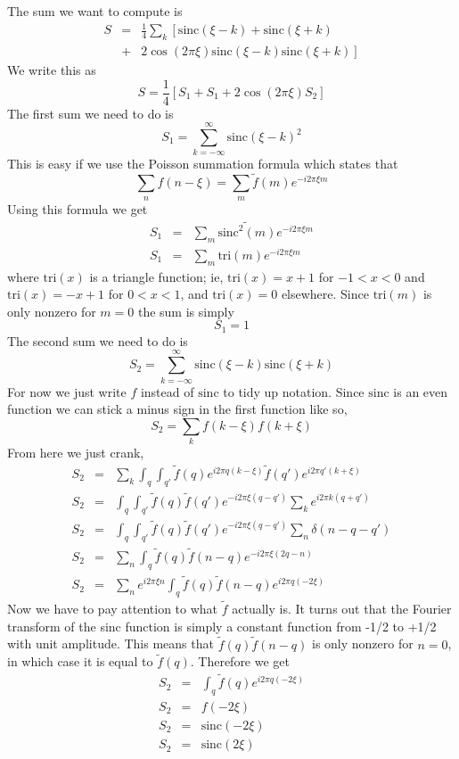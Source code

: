 The sum we want to compute is\begin{eqnarray*}
S & = & \frac{1}{4}\sum_{k}\left[\textrm{sinc}(\xi-k)+\textrm{sinc}(\xi+k)\right.\\
 & + & \left.2\cos(2\pi\xi)\textrm{sinc}(\xi-k)\textrm{sinc}(\xi+k)\right]\end{eqnarray*}
We write this as\[
S=\frac{1}{4}\left[S_{1}+S_{1}+2\cos(2\pi\xi)S_{2}\right]\]
The first sum we need to do is\[
S_{1}=\sum_{k=-\infty}^{\infty}\textrm{sinc}(\xi-k)^{2}\]
This is easy if we use the Poisson summation formula which states
that\[
\sum_{n}f(n-\xi)=\sum_{m}\tilde{f}(m)e^{-i2\pi\xi m}\]
Using this formula we get\begin{eqnarray*}
S_{1} & = & \sum_{m}\widetilde{\textrm{sinc}^{2}\left(m\right)}e^{-i2\pi\xi m}\\
S_{1} & = & \sum_{m}\textrm{tri}(m)e^{-i2\pi\xi m}\end{eqnarray*}
where $\textrm{tri}(x)$ is a triangle function; ie, $\textrm{tri}(x)=x+1$
for $-1<x<0$ and $\textrm{tri}(x)=-x+1$ for $0<x<1$, and $\textrm{tri}(x)=0$
elsewhere. Since $\textrm{tri}(m)$ is only nonzero for $m=0$ the
sum is simply\[
S_{1}=1\]
The second sum we need to do is\[
S_{2}=\sum_{k=-\infty}^{\infty}\textrm{sinc}(\xi-k)\textrm{sinc}(\xi+k)\]
For now we just write $f$ instead of $\textrm{sinc}$ to tidy up
notation. Since $\textrm{sinc}$ is an even function we can stick
a minus sign in the first function like so,\[
S_{2}=\sum_{k}f(k-\xi)f(k+\xi)\]
From here we just crank,\begin{eqnarray*}
S_{2} & = & \sum_{k}\int_{q}\int_{q'}\tilde{f}(q)e^{i2\pi q(k-\xi)}\tilde{f}(q')e^{i2\pi q'(k+\xi)}\\
S_{2} & = & \int_{q}\int_{q'}\tilde{f}(q)\tilde{f}(q')e^{-i2\pi\xi(q-q')}\sum_{k}e^{i2\pi k(q+q')}\\
S_{2} & = & \int_{q}\int_{q'}\tilde{f}(q)\tilde{f}(q')e^{-i2\pi\xi(q-q')}\sum_{n}\delta(n-q-q')\\
S_{2} & = & \sum_{n}\int_{q}\tilde{f}(q)\tilde{f}(n-q)e^{-i2\pi\xi(2q-n)}\\
S_{2} & = & \sum_{n}e^{i2\pi\xi n}\int_{q}\tilde{f}(q)\tilde{f}(n-q)e^{i2\pi q(-2\xi)}\end{eqnarray*}
Now we have to pay attention to what $\tilde{f}$ actually is. It
turns out that the Fourier transform of the sinc function is simply
a constant function from -1/2 to +1/2 with unit amplitude. This means
that $\tilde{f}(q)\tilde{f}(n-q)$ is only nonzero for $n=0$, in
which case it is equal to $\tilde{f}(q)$. Therefore we get\begin{eqnarray*}
S_{2} & = & \int_{q}\tilde{f}(q)e^{i2\pi q(-2\xi)}\\
S_{2} & = & f(-2\xi)\\
S_{2} & = & \textrm{sinc}(-2\xi)\\
S_{2} & = & \textrm{sinc}(2\xi)\end{eqnarray*}
